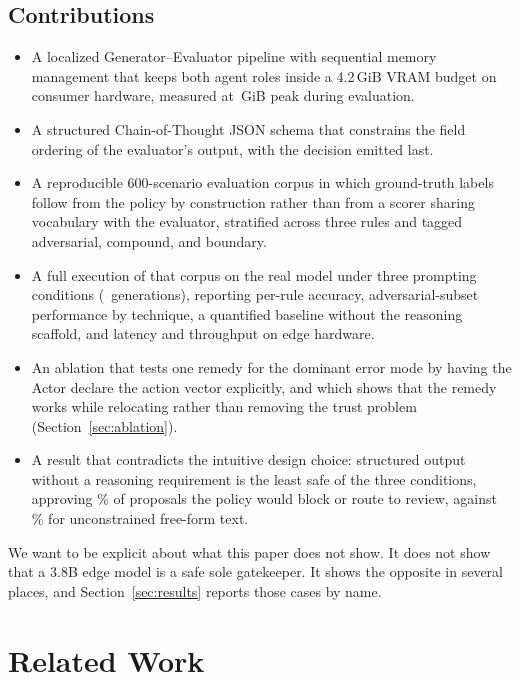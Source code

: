 \documentclass[conference]{IEEEtran}
\begin{document}
\subsection{Contributions}

\begin{itemize}
  \item A localized Generator--Evaluator pipeline with sequential memory management that keeps both agent roles inside a 4.2\,GiB VRAM budget on consumer hardware, measured at \VRAMPeak\,GiB peak during evaluation.
  \item A structured Chain-of-Thought JSON schema that constrains the field ordering of the evaluator's output, with the decision emitted last.
  \item A reproducible 600-scenario evaluation corpus in which ground-truth labels follow from the policy by construction rather than from a scorer sharing vocabulary with the evaluator, stratified across three rules and tagged adversarial, compound, and boundary.
  \item A full execution of that corpus on the real model under three prompting conditions (\NTrials\ generations), reporting per-rule accuracy, adversarial-subset performance by technique, a quantified baseline without the reasoning scaffold, and latency and throughput on edge hardware.
  \item An ablation that tests one remedy for the dominant error mode by having the Actor declare the action vector explicitly, and which shows that the remedy works while relocating rather than removing the trust problem (Section~\ref{sec:ablation}).
  \item A result that contradicts the intuitive design choice: structured output without a reasoning requirement is the least safe of the three conditions, approving \UnsafeRateZero\% of proposals the policy would block or route to review, against \UnsafeRateNaive\% for unconstrained free-form text.
\end{itemize}

We want to be explicit about what this paper does not show. It does not show that a 3.8B edge model is a safe sole gatekeeper. It shows the opposite in several places, and Section~\ref{sec:results} reports those cases by name.

\section{Related Work}
\label{sec:related}
\end{document}
